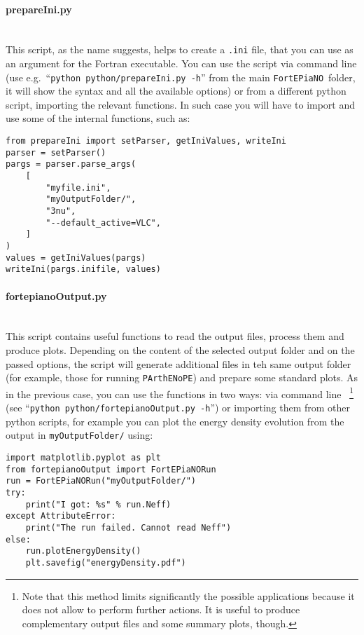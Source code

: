 \documentclass[notitlepage,showpacs,preprintnumbers,amsmath,amssymb,superscriptaddress,prd,onecolumn]{revtex4-1}
\newcommand{\fortepiano}{\texttt{FortEPiaNO}}
\begin{document}
\paragraph{prepareIni.py}~\\
This script, as the name suggests, helps to create a \texttt{.ini} file,
that you can use as an argument for the Fortran executable.
You can use the script via command line
(use e.g.~``\texttt{python python/prepareIni.py -h}''
from the main \fortepiano\ folder, it will show the syntax and all the available options)
or from a different python script, importing the relevant functions.
In such case you will have to import and use some of the internal functions, such as:
\begin{verbatim}
from prepareIni import setParser, getIniValues, writeIni
parser = setParser()
pargs = parser.parse_args(
    [
        "myfile.ini",
        "myOutputFolder/",
        "3nu",
        "--default_active=VLC",
    ]
)
values = getIniValues(pargs)
writeIni(pargs.inifile, values)
\end{verbatim}

\smallskip
\paragraph{fortepianoOutput.py}~\\
This script contains useful functions to read the output files, process them and produce plots.
Depending on the content of the selected output folder and on the passed options,
the script will generate additional files in teh same output folder
(for example, those for running \texttt{PArthENoPE}) and prepare some standard plots.
As in the previous case, you can use the functions in two ways:
via command line~%
\footnote{
Note that this method limits significantly the possible applications
because it does not allow to perform further actions.
It is useful to produce complementary output files and some summary plots, though.
}
(see ``\texttt{python python/fortepianoOutput.py -h}'')
or importing them from other python scripts,
for example you can plot the energy density evolution from the output in \texttt{myOutputFolder/} using:
\begin{verbatim}
import matplotlib.pyplot as plt
from fortepianoOutput import FortEPiaNORun
run = FortEPiaNORun("myOutputFolder/")
try:
    print("I got: %s" % run.Neff)
except AttributeError:
    print("The run failed. Cannot read Neff")
else:
    run.plotEnergyDensity()
    plt.savefig("energyDensity.pdf")
\end{verbatim}
\end{document}
